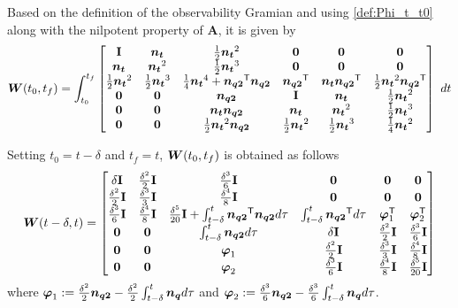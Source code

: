 \documentclass[journal,onecolumn]{IEEEtran}
\begin{document}
Based on the definition of the observability Gramian and using \eqref{def:Phi_t_t0} along with the nilpotent property of ${\mathbf A}$, it is given by
%
	\begin{align}
		\boldsymbol{W}(t_0,t_f)=\int_{t_0}^{t_f}
		\begin{bmatrix}
			\mathbf{I}  & \boldsymbol{n_{t}} & \frac{1}{2}\boldsymbol{n_{t}}^2  & {\bf 0} & {\bf 0} & {\bf 0} \\
			\boldsymbol{n_{t}} & \boldsymbol{n_{t}}^2 & \frac{1}{2}\boldsymbol{n_{t}}^3 & {\bf 0} & {\bf 0} & {\bf 0} \\
			\frac{1}{2}\boldsymbol{n_{t}}^2 & \frac{1}{2}\boldsymbol{n_{t}}^3 & \frac{1}{4}\boldsymbol{n_{t}}^4+\boldsymbol{n_{q2}}^\mathsf{T}\boldsymbol{n_{q2}} & \boldsymbol{n_{q2}}^\mathsf{T} & \boldsymbol{n_{t}}\boldsymbol{n_{q2}}^\mathsf{T} & \frac{1}{2}\boldsymbol{n_{t}}^2\boldsymbol{n_{q2}}^\mathsf{T}\\
			{\bf 0} & {\bf 0} & \boldsymbol{n_{q2}}  & \mathbf{I}  & \boldsymbol{n_{t}} & \frac{1}{2}\boldsymbol{n_{t}}^2\\
			{\bf 0} & {\bf 0} & \boldsymbol{n_{t}}\boldsymbol{n_{q2}} & \boldsymbol{n_{t}} & \boldsymbol{n_{t}}^2 & \frac{1}{2}\boldsymbol{n_{t}}^3\\
			{\bf 0} & {\bf 0} & \frac{1}{2}\boldsymbol{n_{t}}^2\boldsymbol{n_{q2}} & \frac{1}{2}\boldsymbol{n_{t}}^2 & \frac{1}{2}\boldsymbol{n_{t}}^3 & \frac{1}{4}\boldsymbol{n_{t}}^2
		\end{bmatrix}~dt
		\label{eq:W_t0_tf}
	\end{align}

Setting $t_0=t-\delta$ and $t_f=t$, $\boldsymbol{W}(t_0,t_f)$ is obtained as follows
%
	\begin{align}
		\boldsymbol{W}(t-\delta,t)=
		\begin{bmatrix}
			\delta\mathbf{I}  & \frac{\delta^2}{2}\mathbf{I} & \frac{\delta^3}{6}\mathbf{I}  & {\bf 0} & {\bf 0} & {\bf 0} \\
			\frac{\delta^2}{2}\mathbf{I} & \frac{\delta^3}{3}\mathbf{I} & \frac{\delta^4}{8}\mathbf{I} & {\bf 0} & {\bf 0} & {\bf 0} \\
			\frac{\delta^3}{6}\mathbf{I} & \frac{\delta^4}{8}\mathbf{I} & \frac{\delta^5}{20}\mathbf{I}+\int_{t-\delta}^{t}\boldsymbol{n_{q2}}^\mathsf{T}\boldsymbol{n_{q2}}d\tau & \int_{t-\delta}^{t}\boldsymbol{n_{q2}}^\mathsf{T} d\tau & \boldsymbol{\varphi}_1^\mathsf{T} & \boldsymbol{\varphi}_2^\mathsf{T}\\
			{\bf 0} & {\bf 0} & \int_{t-\delta}^{t}\boldsymbol{n_{q2}}d\tau  & \delta\mathbf{I}  & \frac{\delta^2}{2}\mathbf{I} & \frac{\delta^3}{6}\mathbf{I}\\
			{\bf 0} & {\bf 0} & \boldsymbol{\varphi}_1 & \frac{\delta^2}{2}\mathbf{I} & \frac{\delta^3}{3}\mathbf{I} & \frac{\delta^4}{8}\mathbf{I}\\
			{\bf 0} & {\bf 0} & \boldsymbol{\varphi}_2 & \frac{\delta^3}{6}\mathbf{I} & \frac{\delta^4}{8}\mathbf{I} & \frac{\delta^5}{20}\mathbf{I}
		\end{bmatrix}
		\label{eq:W_t_delta}
	\end{align}
%
where $\boldsymbol{\varphi}_1:=\frac{\delta^2}{2}\boldsymbol{n_{q2}} - \frac{\delta^2}{2} \int_{t-\delta}^{t}\boldsymbol{n_{q}}d\tau$ and $\boldsymbol{\varphi}_2:=\frac{\delta^3}{6}\boldsymbol{n_{q2}} - \frac{\delta^3}{6} \int_{t-\delta}^{t}\boldsymbol{n_{q}}d\tau$.
\end{document}
